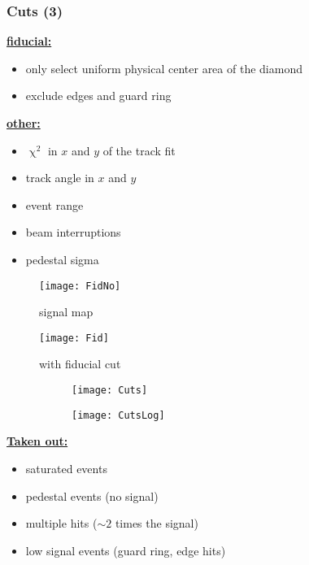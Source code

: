 \begin{frame}
	\frametitle{Cuts (3)}
	\begin{minipage}{8cm}
		\textbf{\underline{fiducial:}}
		\begin{itemize}
			\setlength{\itemsep}{\fill}
			\item only select uniform physical center area of the diamond 
			\item exclude edges and guard ring 
		\end{itemize}
		\vspace*{1cm}
		\textbf{\underline{other:}}
		\begin{itemize}
			\setlength{\itemsep}{\fill}
			\item $\upchi^{2}$ in $x$ and $y$ of the track fit
			\item track angle in $x$ and $y$
			\item event range
			\item beam interruptions
			\item pedestal sigma
		\end{itemize}
	\end{minipage}
	\begin{minipage}{4cm}
		\vspace*{-2pt}
		\begin{figure}
			\centering
			\texttt{[image: FidNo]}
			\vspace*{-8pt}
			\caption{signal map}
		\end{figure}
		\vspace*{-25pt}
		\begin{figure}
			\centering
			\texttt{[image: Fid]}
			\vspace*{-8pt}
			\caption{with fiducial cut}
		\end{figure}
	\end{minipage}
\end{frame}
\begin{frame}
	\vspace*{-5pt}
	\begin{figure} 
		\begin{center}
			\begin{subfigure}{0.45\textwidth}  
				\centering 
				\texttt{[image: Cuts]}
			\end{subfigure}
			\begin{subfigure}{0.45\textwidth} 
				\centering 
				\texttt{[image: CutsLog]}
			\end{subfigure} 
		\end{center}
	\end{figure}
	\textbf{\underline{Taken out:}}
	\begin{itemize}
		\item saturated events
		\item pedestal events (no signal)
		\item multiple hits ($\sim2$ times the signal)
		\item low signal events (guard ring, edge hits)
	\end{itemize}
\end{frame}
